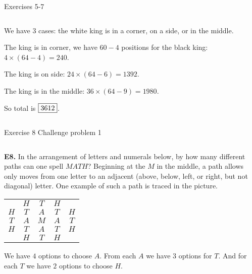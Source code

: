 \documentclass[9pt,aspectratio=169]{beamer}
\begin{document}
\begin{frame}{Exercises 5-7}
\begin{columns}[T]
\begin{column}{0.5\textwidth}
      We have 3 cases: the white king is in a corner, on a side, or in the middle.

      The king is in corner, we have $60-4$ positions for the black king: $4 \times (64 - 4) = 240$.
      
      The king is on side: $24 \times (64 - 6) = 1392$.
      
      The king is in the middle: $36 \times (64 - 9) = 1980$.
      
      So total is $\fbox{3612}$.
      \end{column}
  \end{columns}
\end{frame}

\begin{frame}{Exercise 8\hspace{5cm} Challenge problem 1}
  \begin{columns}[T]
    \begin{column}{0.5\textwidth}
      \begin{problem}
        \textbf{E8.} In the arrangement of letters and numerals below, by how many different paths can one spell $MATH$? Beginning at the $M$ in the middle, a path allows only moves from one letter to an adjacent (above, below, left, or right, but not diagonal) letter. One example of such a path is traced in the picture.
        \begin{center}
          \begin{tabular}{ccccc}
              & \cellcolor{backgroundOrange}$H$ & $T$ & $H$ & \\
            $H$ & \cellcolor{backgroundOrange}$T$ & \cellcolor{backgroundOrange}$A$ & $T$ & $H$ \\
            $T$ & $A$ & \cellcolor{backgroundOrange}$M$ & $A$ & $T$ \\
            $H$ & $T$ & $A$ & $T$ & $H$ \\
              & $H$ & $T$ & $H$ &
          \end{tabular}
        \end{center}
      \end{problem}
      We have $4$ options to choose $A$. From each $A$ we have $3$ options for $T$. And for each $T$ we have $2$ options to choose $H$.
      

\end{column}
\end{columns}
\end{frame}
\end{document}
